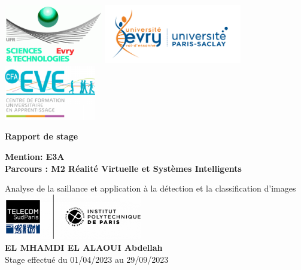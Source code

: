 \documentclass{report}
\begin{document}
\begin{titlepage}

	\begin{center}
		\includegraphics[width=4.3cm]{logo/ufr.png} %
		\hfill
		\includegraphics[width=6cm]{logo/ueve.png} %
		\hfill
		\includegraphics[width=4cm]{logo/cfa.png} %

		\vspace{3cm}
        \newcommand\titleofdoc{\bfseries Rapport de stage }
        \Huge{\titleofdoc} 

        \vspace{0.5cm}
        {\fontsize{15}{20}\textbf{ Mention: E3A}} \\      
        
        {\fontsize{15}{20}\textbf{Parcours : M2 Réalité Virtuelle et Systèmes Intelligents}}\\       

        \vspace{1 cm}

        \LARGE{ Analyse de la saillance et application à la détection et la classification d'images}\\
        \vspace{1 cm}
        {\includegraphics[width=0.45\textwidth]{logo/tsp.png}}\quad\\
        \vspace{2 cm}
        \vspace{0.25cm}
        {\bf {EL MHAMDI EL ALAOUI Abdellah}} \\
        Stage effectué du 01/04/2023 au 29/09/2023\\
        \vspace{3 cm}


\end{center}
\end{titlepage}
\end{document}
